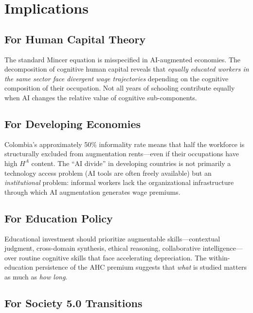 \documentclass[11pt,a4paper]{article}
\theoremstyle{definition}
\begin{document}
\section{Implications}
\label{sec:implications}

\subsection{For Human Capital Theory}

The standard Mincer equation is misspecified in AI-augmented economies. The decomposition of cognitive human capital reveals that \textit{equally educated workers in the same sector face divergent wage trajectories} depending on the cognitive composition of their occupation. Not all years of schooling contribute equally when AI changes the relative value of cognitive sub-components.

\subsection{For Developing Economies}

Colombia's approximately 50\% informality rate means that half the workforce is structurally excluded from augmentation rents---even if their occupations have high $H^A$ content. The ``AI divide'' in developing countries is not primarily a technology access problem (AI tools are often freely available) but an \textit{institutional} problem: informal workers lack the organizational infrastructure through which AI augmentation generates wage premiums.

\subsection{For Education Policy}

Educational investment should prioritize augmentable skills---contextual judgment, cross-domain synthesis, ethical reasoning, collaborative intelligence---over routine cognitive skills that face accelerating depreciation. The within-education persistence of the AHC premium suggests that \textit{what} is studied matters as much as \textit{how long}.

\subsection{For Society 5.0 Transitions}
\end{document}
